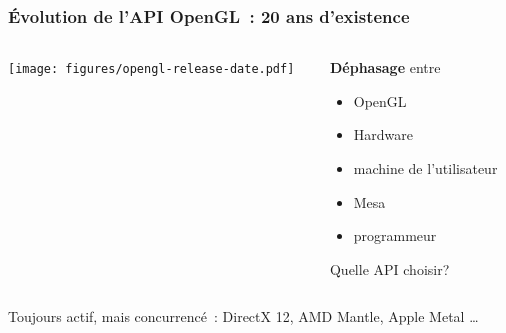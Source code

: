 \begin{frame}
  \frametitle{Évolution de l'API OpenGL~: 20 ans d'existence}
  \begin{columns}
    \begin{column}{.7\textwidth}
      \begin{center}
        \texttt{[image: figures/opengl-release-date.pdf]} %
      \end{center}
    \end{column}
    \begin{column}{.3\textwidth}
      \textbf{Déphasage} entre \\
      \begin{itemize}
      \item OpenGL
      \item Hardware
      \item machine de l'utilisateur
      \item Mesa
      \item programmeur
      \end{itemize}
      \alert{Quelle API choisir?}
    \end{column}
  \end{columns}
    \begin{center}
      \alert{Toujours actif, mais concurrencé~: DirectX 12, AMD Mantle, Apple Metal \ldots}
    \end{center}
\end{frame}


